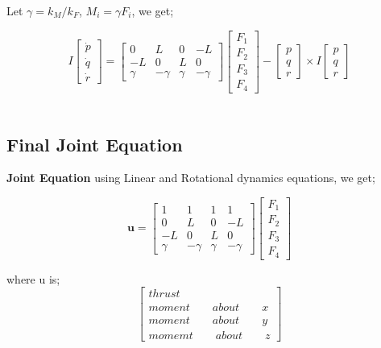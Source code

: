 \documentclass{article}
\begin{document}
Let $\gamma = k_M/k_F$, $M_i = \gamma F_i$, we get;
\vspace{10pt}

\[
I\begin{bmatrix}
    \dot{p} \\
    \dot{q} \\
    \dot{r}
\end{bmatrix} = 
\begin{bmatrix}
    0 & L & 0 & -L \\
    -L & 0 & L & 0 \\
    \gamma & -\gamma & \gamma & -\gamma
\end{bmatrix}
\begin{bmatrix}
    F_1 \\
    F_2 \\
    F_3 \\
    F_4
\end{bmatrix}- 
\begin{bmatrix}
    p \\
    q \\
    r
\end{bmatrix}
\times I\begin{bmatrix}
    p \\
    q \\
    r
\end{bmatrix}
\]
\\

\subsection{Final Joint Equation}

\textbf{Joint Equation} using Linear and Rotational dynamics equations, we get;

\[
\textbf{u} = \begin{bmatrix}
    1 & 1 & 1 & 1 \\
    0 & L & 0 & -L \\
    -L & 0 & L & 0 \\
    \gamma & -\gamma & \gamma & -\gamma
\end{bmatrix}
\begin{bmatrix}
    F_1 \\
    F_2 \\
    F_3 \\
    F_4 
\end{bmatrix}
\]

where u is;
\[
\begin{bmatrix}
    thrust \\
    moment\qquad about\qquad x \\
    moment\qquad about\qquad y \\
    momemt\qquad about\qquad z 
\end{bmatrix}
\]
\\
\end{document}
